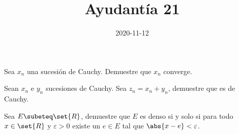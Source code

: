 \documentclass{ayudantia}
\title{Ayudantía 21}
\date{2020-11-12}
\begin{document}
\maketitle

\begin{prob}
    Sea \(x_n\) una sucesión de Cauchy. Demuestre que \(x_n\) converge.
\end{prob}

\begin{ans}
    \begin{sol}

    \end{sol}
\end{ans}



\begin{prob}
    Sean \(x_n\) e \(y_n\) sucesiones de Cauchy. Sea \(z_n=x_n+y_n\), demuestre que es de Cauchy.
\end{prob}

\begin{ans}
    \begin{sol}

    \end{sol}
\end{ans}



\begin{prob}

\end{prob}

\begin{ans}
    \begin{sol}

    \end{sol}
\end{ans}



\begin{prob}
    Sea \(E\subeteq\set{R}\), demuestre que \(E\) es denso si y solo si para todo \(x\in\set{R}\) y \(\varepsilon>0\) existe un \(e\in E\) tal que \(\abs{x-e}<\varepsilon\).
\end{prob}

\begin{ans}
    \begin{sol}

    \end{sol}
\end{ans}
\end{document}
